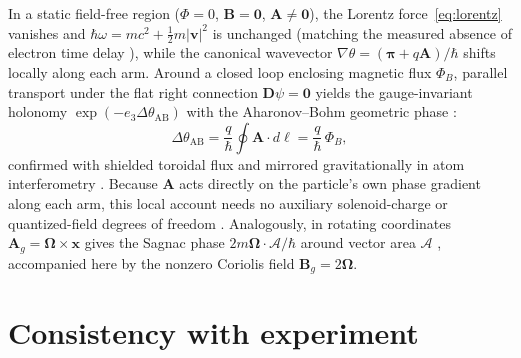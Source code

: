 \documentclass[aps,prd,onecolumn,tightenlines,nofootinbib,notitlepage,10pt,floatfix]{revtex4-2}
\theoremstyle{indentedtheorem}
\begin{document}
In a static field-free region ($\Phi=0$, $\mathbf{B}=\mathbf{0}$, $\mathbf{A}\neq\mathbf{0}$), the Lorentz force~\eqref{eq:lorentz} vanishes and $\hbar\omega=mc^2+\tfrac{1}{2}m|\mathbf{v}|^2$ is unchanged (matching the measured absence of electron time delay \citep{Caprez2007Macroscopic}), while the canonical wavevector $\nabla\theta=(\boldsymbol{\pi}+q\mathbf{A})/\hbar$ shifts locally along each arm. Around a closed loop enclosing magnetic flux $\Phi_B$, parallel transport under the flat right connection $\mathbf{D}\psi=\mathbf{0}$ yields the gauge-invariant holonomy $\exp(-e_3\Delta\theta_\text{AB})$ with the Aharonov--Bohm geometric phase \citep{Aharonov1959Significance,Berry1984Quantal}:
\begin{equation}
    \Delta\theta_\text{AB} = \frac{q}{\hbar}\oint\mathbf{A}\cdot d\boldsymbol{\ell} = \frac{q}{\hbar}\,\Phi_B ,
    \label{eq:ab}
\end{equation}
confirmed with shielded toroidal flux \citep{Chambers1960Shift,Tonomura1986Evidence} and mirrored gravitationally in atom interferometry \citep{Hohensee2012Force,Overstreet2022Observation}. Because $\mathbf{A}$ acts directly on the particle's own phase gradient along each arm, this local account needs no auxiliary solenoid-charge or quantized-field degrees of freedom \citep{Vaidman2012Role,Aharonov2016Nonlocality,Marletto2020Aharonov}. Analogously, in rotating coordinates $\mathbf{A}_g=\boldsymbol{\Omega}\times\mathbf{x}$ gives the Sagnac phase $2m\boldsymbol{\Omega}\cdot\boldsymbol{\mathcal{A}}/\hbar$ around vector area $\boldsymbol{\mathcal{A}}$ \citep{Sagnac1913Effect,Werner1979Effect}, accompanied here by the nonzero Coriolis field $\mathbf{B}_g=2\boldsymbol{\Omega}$.

\section{Consistency with experiment}
\label{sec:experiment}
\end{document}
